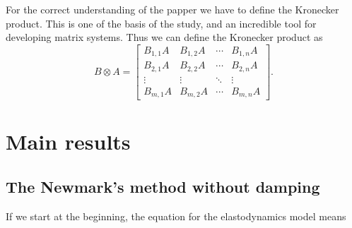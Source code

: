 \documentclass{ws-m3as}
\begin{document}
For the correct understanding of the papper we have to define the Kronecker product. This is one of the basis of the study, and an incredible tool for developing matrix systems. Thus we can define the Kronecker product as
$$
B \otimes A = \left[
\begin{array}{cccc}
B_{1,1} A & B_{1,2} A & \cdots & B_{1,n}A \\
B_{2,1} A & B_{2,2} A & \cdots & B_{2,n}A \\
\vdots & \vdots & \ddots & \vdots \\ 
B_{m,1} A & B_{m,2} A & \cdots & B_{m,n}A
\end{array}
\right].
$$



\section{Main results}



\subsection{The Newmark's method without damping}


If we start at the beginning, the equation for the elastodynamics model means
\end{document}
